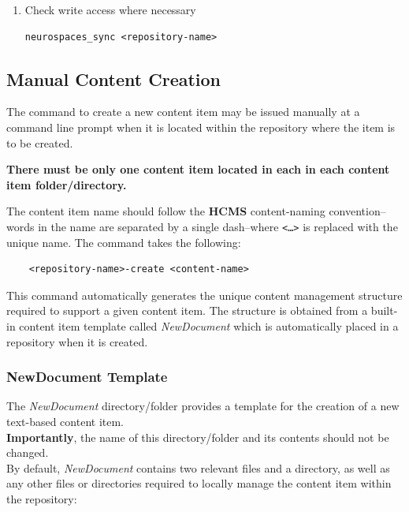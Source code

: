 \documentclass[12pt]{article}
\begin{document}
\begin{description}
\begin{enumerate}
\item {Check write access where necessary}
\begin{verbatim}
neurospaces_sync <repository-name>
\end{verbatim}
\end{enumerate}

\end{description}

\subsection{Manual Content Creation}

The command to create a new content item may be issued manually at a command line prompt when it is located within the repository where the item is to be created.

{\bf There must be only one content item located in each in each content item folder/directory.}

The content item name should follow the {\bf \small HCMS} content-naming convention--words in the name are separated by a single dash--where {\tt <\dots>} is replaced with the unique name. The command takes the following:
\begin{verbatim}
	<repository-name>-create <content-name>
\end{verbatim}

This command automatically generates the unique content management structure required to support a given content item. The structure is obtained from a built-in content item template called {\it NewDocument} which is automatically placed in a repository when it is created.

\subsubsection{NewDocument Template}

The {\it NewDocument} directory/folder provides a template for the creation of a new text-based content item.\\
{\bf Importantly}, the name of this directory/folder and its contents should not be changed.\\
By default, {\it NewDocument} contains two relevant files and a directory, as well as any other {\bf \small} files or directories required to locally manage the content item within the repository:
\end{document}
